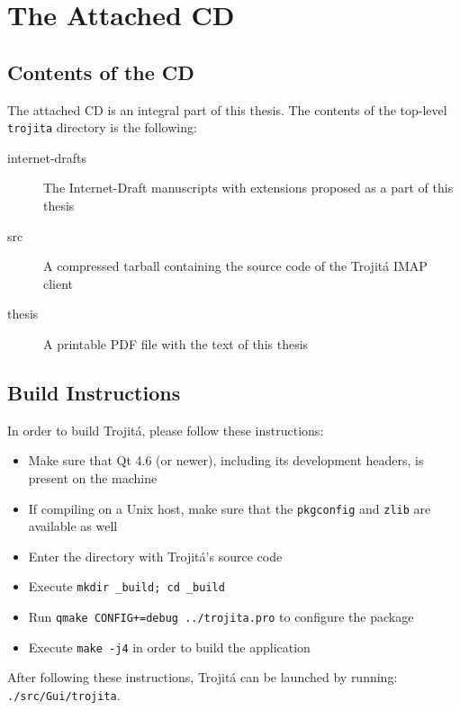 \documentclass[trojita]{subfiles}
\begin{document}
\chapter{The Attached CD}
\label{sec:source-cd}

\section{Contents of the CD}

The attached CD is an integral part of this thesis.  The contents of the top-level {\tt trojita} directory is the
following:

\begin{description}
    \item[internet-drafts] The Internet-Draft manuscripts with extensions proposed as a part of this thesis
    \item[src] A compressed tarball containing the source code of the Trojitá IMAP client
    \item[thesis] A printable PDF file with the text of this thesis
\end{description}

\section{Build Instructions}

In order to build Trojitá, please follow these instructions:

\begin{itemize}
  \item Make sure that Qt 4.6 (or newer), including its development headers, is present on the machine
  \item If compiling on a Unix host, make sure that the {\tt pkgconfig} and {\tt zlib} are available as well
  \item Enter the directory with Trojitá's source code
  \item Execute {\tt mkdir \_build; cd \_build}
  \item Run {\tt qmake CONFIG+=debug ../trojita.pro} to configure the package
  \item Execute {\tt make -j4} in order to build the application
\end{itemize}

After following these instructions, Trojitá can be launched by running: \\ 
{\tt ./src/Gui/trojita}.
\end{document}
